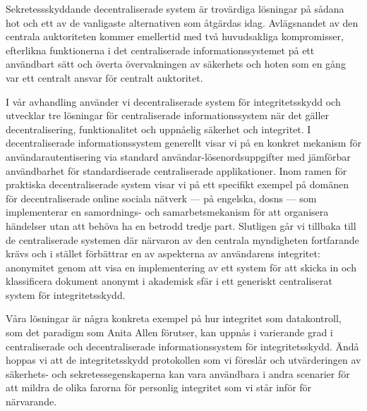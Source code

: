     Sekretessskyddande decentraliserade system är trovärdiga lösningar på sådana 
    hot och ett av de vanligaste alternativen som åtgärdas idag. Avlägsnandet av 
    den centrala auktoriteten kommer emellertid med två huvudsakliga kompromisser, 
    efterlikna funktionerna i det centraliserade informationssystemet 
    på ett användbart sätt och överta övervakningen av säkerhets och hoten som 
    en gång var ett centralt ansvar för centralt auktoritet.
    
    I vår avhandling använder vi decentraliserade system för integritetsskydd 
    och utvecklar tre lösningar för centraliserade informationssystem när det gäller 
    decentralisering, funktionalitet och uppnåelig säkerhet och integritet. I decentraliserade 
    informationssystem generellt visar vi på en konkret mekanism för användarautentisering 
    via standard användar-lösenordsuppgifter med jämförbar användbarhet för standardiserade 
    centraliserade applikationer. Inom ramen för praktiska decentraliserade system 
    visar vi på ett specifikt exempel på domänen för decentraliserade online sociala 
    nätverk --- på engelska, \aclp*{dosn} --- som implementerar en samordnings- 
    och samarbetsmekanism för att organisera händelser utan att behöva ha en betrodd 
    tredje part. Slutligen går vi tillbaka till de centraliserade systemen där närvaron 
    av den centrala myndigheten fortfarande krävs och i stället förbättrar en av 
    aspekterna av användarens integritet: anonymitet genom att visa en implementering 
    av ett system för att skicka in och klassificera dokument anonymt i akademisk 
    sfär i ett generiskt centraliserat system för integritetsskydd.
    
    Våra lösningar är några konkreta exempel på hur integritet som datakontroll, 
    som det paradigm som Anita Allen förutser, kan uppnås i varierande grad i centraliserade 
    och decentraliserade informationssystem för integritetsskydd. Ändå hoppas vi 
    att de integritetsskydd protokollen som vi föreslår och utvärderingen av säkerhets- 
    och sekretessegenskaperna kan vara användbara i andra scenarier för att mildra 
    de olika farorna för personlig integritet som vi står inför för närvarande.
